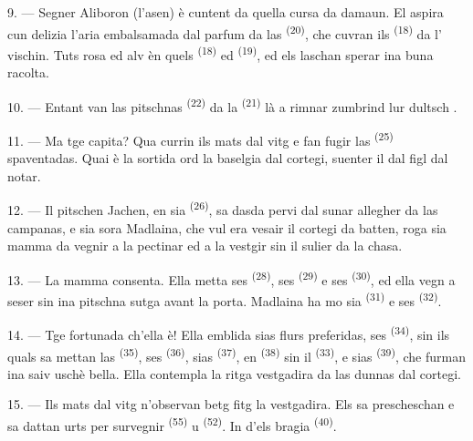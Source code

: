 \VUsaut{4.0mm}
\VUsaut{3.4mm}

9. --- Segner Aliboron (l'asen) è cuntent da quella cursa da damaun. El aspira cun
delizia l'aria embalsamada dal parfum da las  \textsuperscript{(20)}, che
cuvran ils  \textsuperscript{(18)} da l'
vischin. Tuts rosa ed alv èn quels  \textsuperscript{(18)} ed
 \textsuperscript{(19)}, ed els laschan sperar ina buna racolta.

10. --- Entant van las pitschnas  \textsuperscript{(22)} da la  \textsuperscript{(21)} là a rimnar zumbrind lur dultsch .

11. --- Ma tge capita? Qua currin ils mats dal vitg e fan fugir las 
\textsuperscript{(25)} spaventadas. Quai è la sortida ord la baselgia dal cortegi,
suenter il  dal figl dal notar.

12. --- Il pitschen Jachen, en sia  \textsuperscript{(26)}, sa dasda pervi
dal sunar allegher da las campanas, e sia sora Madlaina, che vul era vesair il
cortegi da batten, roga sia mamma da vegnir a la pectinar ed a la vestgir sin il
sulier da la chasa.

13. --- La mamma consenta. Ella metta ses  \textsuperscript{(28)}, ses
 \textsuperscript{(29)} e ses  \textsuperscript{(30)}, ed
ella vegn a seser sin ina pitschna sutga avant la porta. Madlaina ha mo sia
 \textsuperscript{(31)} e ses  \textsuperscript{(32)}.

14. --- Tge fortunada ch'ella è! Ella emblida sias flurs preferidas, ses
 \textsuperscript{(34)}, sin ils quals sa mettan las
 \textsuperscript{(35)}, ses  \textsuperscript{(36)},
sias  \textsuperscript{(37)}, en 
\textsuperscript{(38)} sin il  \textsuperscript{(33)}, e sias
 \textsuperscript{(39)}, che furman ina saiv uschè bella. Ella
contempla la ritga vestgadira da las dunnas dal cortegi.

15. --- Ils mats dal vitg n'observan betg fitg la vestgadira. Els sa prescheschan
e sa dattan urts per survegnir  \textsuperscript{(55)} u
 \textsuperscript{(52)}. In d'els bragia \textsuperscript{(40)}.

